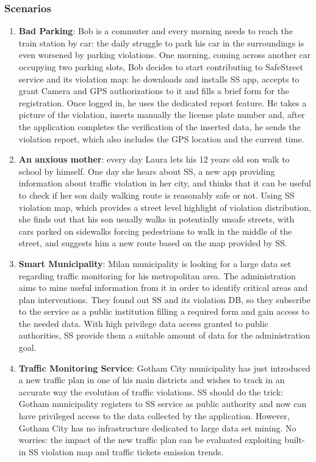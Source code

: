 	\subsubsection{Scenarios}
	\begin{enumerate}
	\item \textbf{Bad Parking}: Bob is a commuter and every morning needs to reach the train station by car: the daily struggle to park his car in the surroundings is even worsened by parking violations. One morning, coming across another car occupying two parking slots, Bob decides to start contributing to SafeStreet service and its violation map: he downloads and installs SS app, accepts to grant Camera and GPS authorizations to it and fills a brief form for the registration. Once logged in, he uses the dedicated report feature. He takes a picture of the violation, inserts manually the license plate number and, after the application completes the verification of the inserted data, he sends the violation report, which also includes the GPS location and the current time.
 	\item \textbf{An anxious mother}: every day Laura lets his 12 years old son walk to school by himself. One day she hears about SS, a new app providing information about traffic violation in her city, and thinks that it can be useful to check if her son daily walking route is reasonably safe or not. Using SS violation map, which provides a street level highlight of violation distribution, she finds out that his son usually walks in potentially unsafe streets, with cars parked on sidewalks forcing pedestrians to walk in the middle of the street, and suggests him a new route based on the map provided by SS.
	\item \textbf{Smart Municipality}: Milan municipality is looking for a large data set regarding traffic monitoring for his metropolitan area. The administration aims to mine useful information from it in order to identify critical areas and plan interventions. They found out SS and its violation DB, so they subscribe to the service as a public institution filling a required form and gain access to the needed data. With high privilege data access granted to public authorities, SS provide them a suitable amount of data for the administration goal.
	\item \textbf{Traffic Monitoring Service}: Gotham City municipality has just introduced a new traffic plan in one of his main districts and wishes to track in an accurate way the evolution of traffic violations. SS should do the trick: Gotham municipality registers to SS service as public authority and now can have privileged access to the data collected by the application. However, Gotham City has no infrastructure dedicated to large data set mining. No worries: the impact of the new traffic plan can be evaluated exploiting built-in SS violation map and traffic tickets emission trends.

\end{enumerate}
